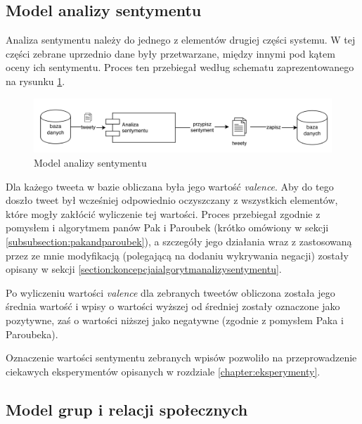 \subsection{Model analizy sentymentu}
\label{subsection:modelanalizysentymentu}

Analiza sentymentu należy do jednego z elementów drugiej części systemu.
W tej części zebrane uprzednio dane były przetwarzane, między innymi pod kątem
oceny ich sentymentu. Proces ten przebiegał według schematu
zaprezentowanego na rysunku \ref{image:model-analizy-sentymentu}.

\begin{figure}[ht!]
\centering
\includegraphics[width=160mm]{img/model-analizy-sentymentu.png}
\caption{Model analizy sentymentu}
\label{image:model-analizy-sentymentu}
\end{figure}


Dla każego tweeta w bazie obliczana była jego wartość \textit{valence}.
Aby do tego doszło tweet był wcześniej odpowiednio oczyszczany z wszystkich
elementów, które mogły zakłócić wyliczenie tej wartości. Proces przebiegał
zgodnie z pomysłem i algorytmem panów Pak i Paroubek (krótko omówiony w sekcji
\ref{subsubsection:pakandparoubek}), a szczegóły jego działania wraz z
zastosowaną przez ze mnie modyfikacją (polegającą na dodaniu wykrywania negacji)
zostały opisany w sekcji \ref{section:koncepcjaialgorytmanalizysentymentu}.

Po wyliczeniu wartości \textit{valence} dla zebranych tweetów obliczona została
jego średnia wartość i wpisy o wartości wyższej od średniej zostały oznaczone
jako pozytywne, zaś o wartości niższej jako negatywne (zgodnie z pomysłem Paka
i Paroubeka).

Oznaczenie wartości sentymentu zebranych wpisów pozwoliło na przeprowadzenie
ciekawych eksperymentów opisanych w rozdziale \ref{chapter:eksperymenty}.


\subsection{Model grup i relacji społecznych}
\label{subsection:modelgrupirelacjispolecznych}



